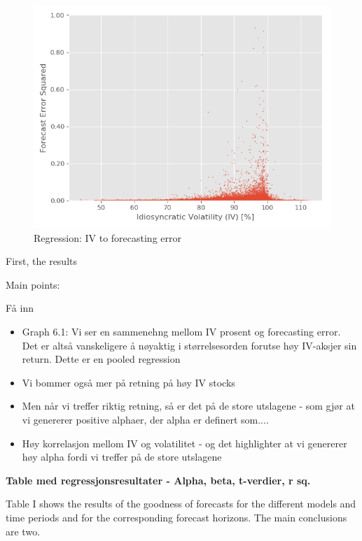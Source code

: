 \begin{figure}[h]
    \centering
    \includegraphics[scale = 0.7]{Plot/ScatterRegression.png}
    \caption{Regression: IV to forecasting error}
    \label{visualization}
\end{figure}

First, the results 

Main points:

Få inn 

\begin{itemize}
    \item Graph 6.1: Vi ser en sammenehng mellom IV prosent og forecasting error. Det er altså vanskeligere å nøyaktig i størrelsesorden forutse høy IV-aksjer sin return. Dette er en pooled regression
    \item Vi bommer også mer på retning på høy IV stocks
    \item Men når vi treffer riktig retning, så er det på de store utslagene - som gjør at vi genererer positive alphaer, der alpha er definert som....
    \item Høy korrelasjon mellom IV og volatilitet - og det highlighter at vi genererer høy alpha fordi vi treffer på de store utslagene
\end{itemize}

\textbf{Table med regressjonsresultater - Alpha, beta, t-verdier, r sq.}

Table I shows the results of the goodness of forecasts for the different models and time periods and
for the corresponding forecast horizons. The main conclusions are two.

